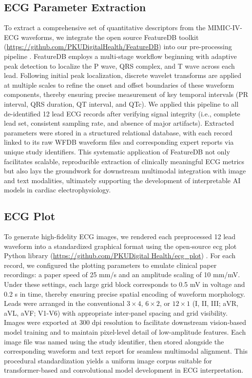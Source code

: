 \documentclass[12pt,letterpaper]{article}
\begin{document}
\subsection*{ECG Parameter Extraction}

To extract a comprehensive set of quantitative descriptors from the MIMIC-IV-ECG waveforms, we integrate the open source FeatureDB toolkit (\url{https://github.com/PKUDigitalHealth/FeatureDB}) into our pre-processing pipeline \cite{fan2025detecting, hong2020cardiolearn}. FeatureDB employs a multi-stage workflow beginning with adaptive peak detection to localize the P wave, QRS complex, and T wave across each lead. Following initial peak localization, discrete wavelet transforms are applied at multiple scales to refine the onset and offset boundaries of these waveform components, thereby ensuring precise measurement of key temporal intervals (PR interval, QRS duration, QT interval, and QTc). We applied this pipeline to all de-identified 12 lead ECG records after verifying signal integrity (i.e., complete lead set, consistent sampling rate, and absence of major artifacts). Extracted parameters were stored in a structured relational database, with each record linked to its raw WFDB waveform files and corresponding expert reports via unique study identifiers. This systematic application of FeatureDB not only facilitates scalable, reproducible extraction of clinically meaningful ECG metrics but also lays the groundwork for downstream multimodal integration with image and text modalities, ultimately supporting the development of interpretable AI models in cardiac electrophysiology.

\subsection*{ECG Plot}

To generate high-fidelity ECG images, we rendered each preprocessed 12 lead waveform into a standardized graphical format using the open‑source ecg plot Python library (\url{https://github.com/PKUDigital Health/ecg_plot}) \cite{zhang2023artificial}. For each record, we configured the plotting parameters to emulate clinical paper recordings: a paper speed of 25 mm/s and an amplitude scaling of 10 mm/mV. Under these settings, each large grid block corresponds to 0.5 mV in voltage and 0.2 s in time, thereby ensuring precise spatial encoding of waveform morphology. Leads were arranged in the conventional $3\times4$, $6\times2$, or $12\times1$ (I, II, III; aVR, aVL, aVF; V1-V6) with appropriate inter‑panel spacing and grid visibility. Images were exported at 300 dpi resolution to facilitate downstream vision‑based model training and to maintain pixel-level detail of low-amplitude features. Each image file was named using the study identifier, then stored alongside the corresponding waveform and text report for seamless multimodal alignment. This procedural standardization yields a uniform image corpus suitable for transformer-based and convolutional model development in ECG interpretation.
\end{document}
